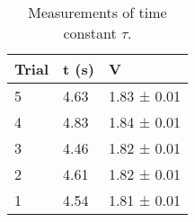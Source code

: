 \documentclass{report}
\begin{document}
\begin{table}[]
	\begin{tabular}{@{}lll@{}}
		\toprule
		Trial & t (s) & V           \\ \midrule
		5     & 4.63  & 1.83 ± 0.01 \\
		4     & 4.83  & 1.84 ± 0.01 \\
		3     & 4.46  & 1.82 ± 0.01 \\
		2     & 4.61  & 1.82 ± 0.01 \\
		1     & 4.54  & 1.81 ± 0.01 \\ \bottomrule
	\end{tabular}
	\caption{Measurements of time constant $\tau$.}
	\label{tau}
\end{table}
\end{document}
